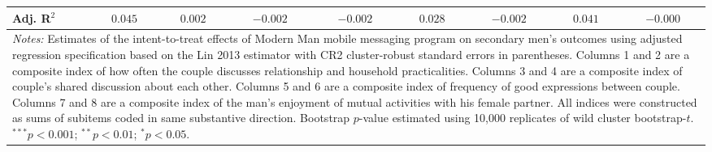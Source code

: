 \begin{tabular}{l c c c c c c c c}
Adj. R$^2$          & $0.045$        & $0.002$        & $-0.002$       & $-0.002$       & $0.028$        & $-0.002$       & $0.041$        & $-0.000$       \\
\bottomrule
\multicolumn{9}{l}{\scriptsize{\parbox{\linewidth}{\vspace{2pt}
       \textit{Notes:} Estimates of the intent-to-treat effects of Modern Man mobile
       messaging program on secondary men's outcomes using adjusted regression
       specification based on the Lin 2013 estimator with CR2 cluster-robust
       standard errors in parentheses. Columns 1 and 2 are a composite index of
       how often the couple discusses relationship and household practicalities. 
       Columns 3 and 4 are a composite index of couple's shared discussion about each other.
       Columns 5 and 6 are a composite index of frequency of good expressions between couple.
       Columns 7 and 8 are a composite index of the man's enjoyment of mutual activities with 
       his female partner. All indices were constructed as sums of subitems coded in
       same substantive direction. Bootstrap $p$-value estimated using 10,000 replicates of wild
       cluster bootstrap-$t$. \\ $^{***}p<0.001$; $^{**}p<0.01$; $^{*}p<0.05$.}}}
\end{tabular}
